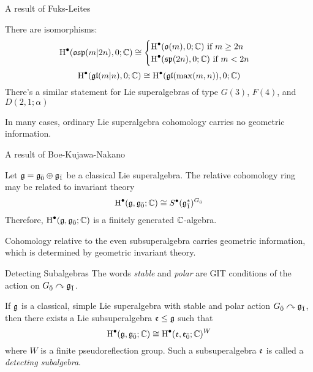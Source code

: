 \documentclass{beamer}
\begin{document}
\begin{frame}{A result of Fuks-Leites}\pause
  \begin{theorem}
    There are isomorphisms:
    \[
      \operatorname{H}^\bullet(\mathfrak{osp}(m|2n),0;\mathbb{C}) \cong
      \begin{cases}
        \operatorname{H}^\bullet(\mathfrak{o}(m),0;\mathbb{C}) \text{ if } m \geq 2n \\
        \operatorname{H}^\bullet(\mathfrak{sp}(2n),0;\mathbb{C}) \text{ if } m < 2n
      \end{cases}
    \]
    \[
      \operatorname{H}^\bullet(\mathfrak{gl}(m|n),0;\mathbb{C}) \cong \operatorname{H}^\bullet(\mathfrak{gl}(\max(m,n)),0;\mathbb{C})
    \]
      There's a similar statement for Lie superalgebras of type $G(3)$, $F(4)$, and $D(2,1;\alpha)$
    \end{theorem}\pause
    \begin{theorem}[Restated]
      In many cases, ordinary Lie superalgebra cohomology carries no geometric information.
    \end{theorem}
\end{frame}

\begin{frame}{A result of Boe-Kujawa-Nakano}\pause

  \begin{theorem}
    Let $\mathfrak{g} = {\mathfrak{g}}_{\bar{0}} \oplus {\mathfrak{g}}_{\bar{1}}$ be a classical Lie superalgebra. The relative cohomology ring may be related to invariant theory
    \[
      \operatorname{H}^\bullet(\mathfrak{g},{\mathfrak{g}}_{\bar{0}};\mathbb{C}) \cong S^\bullet({\mathfrak{g}}_{\bar{1}}^*)^{{G}_{\bar{0}}}
    \]
    Therefore, $\operatorname{H}^\bullet(\mathfrak{g},{\mathfrak{g}}_{\bar{0}};\mathbb{C})$ is a finitely generated $\mathbb{C}$-algebra.
  \end{theorem}\pause
  \begin{theorem}[Restated]
    Cohomology relative to the even subsuperalgebra carries geometric information, which is determined by geometric invariant theory.
  \end{theorem}
\end{frame}

\begin{frame}{Detecting Subalgebras}\pause
  The words \emph{stable} and \emph{polar} are GIT conditions of the action on ${G}_{\bar{0}} \curvearrowright {\mathfrak{g}}_{\bar{1}}$.\pause
  \begin{theorem}
    If $\mathfrak{g}$ is a classical, simple Lie superalgebra with stable and polar action ${G}_{\bar{0}} \curvearrowright {\mathfrak{g}}_{\bar{1}}$, then there exists a Lie subsuperalgebra $\mathfrak{e} \leq \mathfrak{g}$ such that
    \[
      \operatorname{H}^\bullet(\mathfrak{g},{\mathfrak{g}}_{\bar{0}};\mathbb{C}) \cong \operatorname{H}^\bullet(\mathfrak{e},{\mathfrak{e}}_{\bar{0}};\mathbb{C})^W
    \]
    where $W$ is a finite pseudoreflection group. Such a subsuperalgebra $\mathfrak{e}$ is called a \emph{detecting subalgebra}.
  \end{theorem}
\end{frame}
\end{document}
